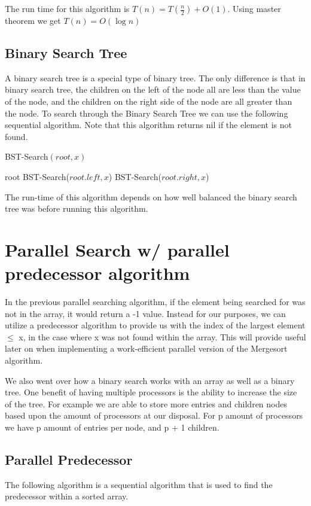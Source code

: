 \documentclass[11pt]{article}
\begin{document}
The run time for this algorithm is $T(n) = T(\frac{n}{2}) + O(1)$. Using master theorem we get $T(n) = O(\log n)$


\subsection{Binary Search Tree}
A binary search tree is a special type of binary tree. The only difference is that in binary search tree, the children on the left of the node all are less than the value of the node, and the children on the right side of the node are all greater than the node. To search through the Binary Search Tree we can use the following sequential algorithm. Note that this algorithm returns nil if the element is not found.

\begin{algorithm}
\caption{BST-Search$(root,x)$}
\begin{algorithmic}
    \RETURN root
    \RETURN BST-Search($root.left,x$)
\ELSE
    \RETURN BST-Search($root.right,x$)
\ENDIF
\end{algorithmic}
\end{algorithm}

The run-time of this algorithm depends on how well balanced the binary search tree was before running this algorithm.

\section{Parallel Search w/ parallel predecessor algorithm}
In the previous parallel searching algorithm, if the element being searched for was not in the array, it would return a -1 value. Instead for our purposes, we can utilize a predecessor algorithm to provide us with the index of the largest element $\leq$ x, in the case where x was not found within the array. This will provide useful later on when implementing a work-efficient parallel version of the Mergesort algorithm.

We also went over how a binary search works with an array as well as a binary tree. One benefit of having multiple processors is the ability to increase the size of the tree. For example we are able to store more entries and children nodes based upon the amount of processors at our disposal. For p amount of processors we have p amount of entries per node, and p + 1 children.

\subsection{Parallel Predecessor}
 The following algorithm is a sequential algorithm that is used to find the predecessor within a sorted array.
\end{document}
